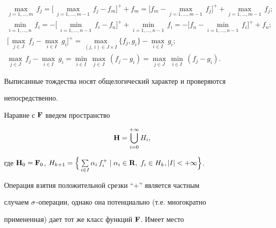 \begin{gather}


\max_{j=1,\dotsc,m}\, f_j = \bigl[\, \max_{j=1,\dotsc,m-1}\, f_j


-f_m\bigr]^+ +f_m =


\bigl[f_m - \max_{j=1,\dotsc,m-1}\, f_j \bigr]^+ + \max_{j=1,\dotsc


,m-1}\, f_j; \\


%


\min_{i=1,\dotsc,n}\, f_i = - \bigl[\, \min_{i=1,\dotsc,n-1}\, f_i


-f_n\bigr]^+ + \min_{i=1,\dotsc,n-1}\, f_i =


-\bigl[f_n - \min_{i=1,\dotsc ,n-1}\, f_i \bigr]^+ +f_n;\\


%


\bigl[\, \max_{j\in J}\, f_j - \max_{i\in I}\, g_i \bigr]^+ =


\max_{(j,\,i) \in J\times I}\{f_j, g_i\} - \max_{i\in I}\, g_i;\\


%


\max_{j\in J}\, f_j - \max_{i\in I}\, g_i = \min_{i\in I}\,


\max_{j\in J}\, (f_j -g_i) = \max_{j\in J}\, \min_{i\in I}\, (f_j-g_i).


\end{gather}


Выписанные тождества носят общелогический характер и проверяются


непосредственно.





Наравне с $\bold F$ введем пространство


$$


\bold H = \bigcup_{i=0}^{+\infty}H_i,


$$


где $\bold H_0=\F_0$, $H_{k+1} =\Bigl\{\, \svij{i\in I}{}


\al_i\, f_i^+ \mid \al_i \in \R,\; f_i \in H_k, |I|< \pli \Bigr\}$.





Операция взятия положительной срезки ``$+$'' является частным


случаем $\sigma$-операции, однако она потенциально (т.е. многократно


примененная) дает тот же класс функций $\bold F$. Имеет место





